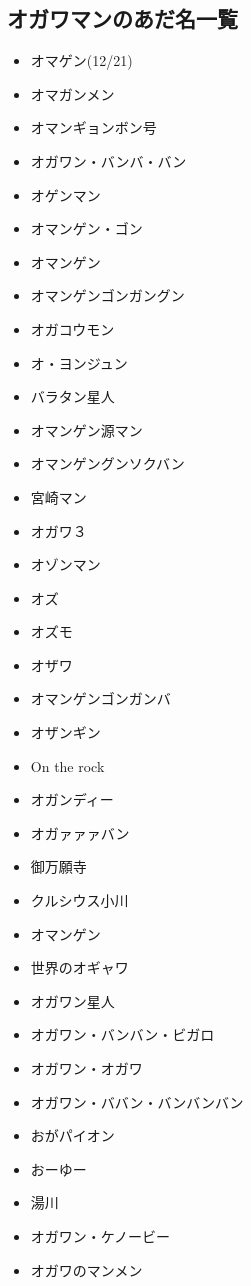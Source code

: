 \subsection{オガワマンのあだ名一覧}
\begin{itemize}
\item オマゲン(12/21)
\item オマガンメン
\item オマンギョンボン号
\item オガワン・バンバ・バン
\item オゲンマン
\item オマンゲン・ゴン
\item オマンゲン
\item オマンゲンゴンガングン
\item オガコウモン
\item オ・ヨンジュン
\item バラタン星人
\item オマンゲン源マン
\item オマンゲングンソクバン
\item 宮崎マン
\item オガワ３
\item オゾンマン
\item オズ
\item オズモ
\item オザワ
\item オマンゲンゴンガンバ
\item オザンギン
\item On the rock
\item オガンディー
\item オガァァァバン
\item 御万願寺
\item クルシウス小川
\item オマンゲン
\item 世界のオギャワ
\item オガワン星人
\item オガワン・バンバン・ビガロ
\item オガワン・オガワ
\item オガワン・ババン・バンバンバン
\item おがパイオン
\item おーゆー
\item 湯川
\item オガワン・ケノービー
\item オガワのマンメン
\end{itemize}

